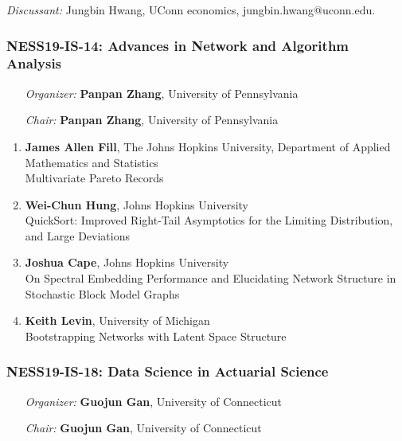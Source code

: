 \emph{Discussant:} Jungbin Hwang, UConn economics, jungbin.hwang@uconn.edu.

\subsubsection*{NESS19-IS-14: Advances in Network and Algorithm Analysis}

\begin{enumerate}[align=left]
\item [\emph{Organizer:}] \textbf{Panpan Zhang}, University of Pennsylvania
\item [\emph{Chair:}] \textbf{Panpan Zhang}, University of Pennsylvania
\end{enumerate}

\begin{enumerate}
\item \textbf{James Allen Fill}, The Johns Hopkins University, Department of Applied Mathematics and Statistics \\
Multivariate Pareto Records
\item \textbf{Wei-Chun Hung}, Johns Hopkins University \\
QuickSort: Improved Right-Tail Asymptotics for the Limiting Distribution, and Large Deviations
\item \textbf{Joshua Cape}, Johns Hopkins University \\
On Spectral Embedding Performance and Elucidating Network Structure in Stochastic Block Model Graphs
\item \textbf{Keith Levin}, University of Michigan \\
Bootstrapping Networks with Latent Space Structure
\end{enumerate}

\subsubsection*{NESS19-IS-18: Data Science in Actuarial Science}

\begin{enumerate}[align=left]
\item [\emph{Organizer:}] \textbf{Guojun Gan}, University of Connecticut
\item [\emph{Chair:}] \textbf{Guojun Gan}, University of Connecticut
\end{enumerate}

